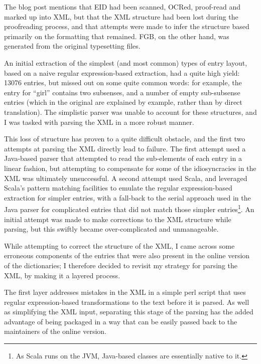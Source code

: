 The blog post mentions that EID had been scanned, OCRed, proof-read and marked
up into XML, but that the XML structure had been lost during the proofreading
process, and that attempts were made to infer the structure based primarily
on the formatting that remained. FGB, on the other hand, was generated from
the original typesetting files.


An initial extraction of the simplest (and most common) types of entry layout,
based on a na\:ive regular expression-based extraction,
had a quite high yield: 13076 entries, but missed out on some quite
common words: for example, the entry for ``girl'' contains two subsenses, and 
a number of empty sub-subsense entries (which in the original are explained by
example, rather than by direct translation). The simplistic parser was unable 
to account for these structures, and I was tasked with parsing the XML in a more
robust manner.

This loss of structure has proven to a quite difficult obstacle, and the first two
attempts at parsing the XML directly lead to failure. The first attempt used
a Java-based parser that attempted to read the sub-elements of each entry in a
linear fashion, but attempting to compensate for some of the idiosyncracies in
the XML was ultimately unsuccessful. A second attempt used Scala, and leveraged
Scala's pattern matching facilities to emulate the regular expression-based
extraction for simpler entries, with a fall-back to the serial approach used
in the Java parser for complicated entries that did not match those simpler
entries\footnote{As Scala runs on the JVM, Java-based classes are essentially 
native to it.}. An initial attempt was made to make corrections to the XML structure
while parsing, but this swiftly became over-complicated and unmanageable.

While attempting to correct the structure of the XML, I came across some 
erroneous components of the entries that were also present in the online
version of the dictionaries; I therefore decided to revisit my strategy for
parsing the XML, by making it a layered process.

The first layer addresses mistakes in the XML in a simple perl script that
uses regular expression-based transformations to the text before it is parsed.
As well as simplifying the XML input, separating this stage of the parsing
has the added advantage of being packaged in a way that can be easily passed 
back to the maintainers of the online version.

